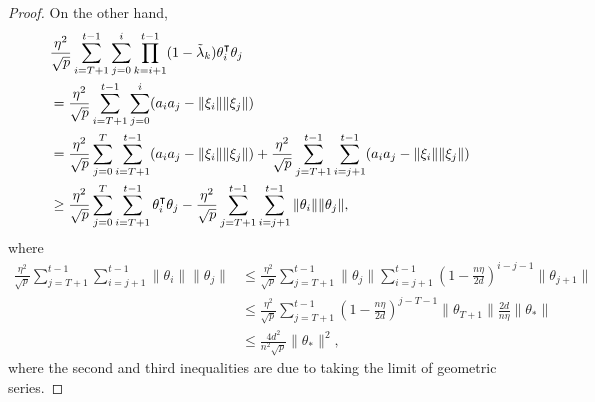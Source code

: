 \begin{proof}
    On the other hand, 
    \begin{align*}
        & \frac{\eta^2}{\sqrt p}\sum_{i=T+1}^{t-1}\sum_{j=0}^i\prod_{k=i+1}^{t-1}(1-\tlam_k) \theta_i\transpose\theta_j \\
        & = \frac{\eta^2}{\sqrt p}\sum_{i=T+1}^{t-1}\sum_{j=0}^i (a_i a_j - \|\xi_i\|\|\xi_j\|) \\
        & = \frac{\eta^2}{\sqrt p}\sum_{j=0}^T \sum_{i=T+1}^{t-1} (a_i a_j - \|\xi_i\|\|\xi_j\|) + \frac{\eta^2}{\sqrt p} \sum_{j=T+1}^{t-1} \sum_{i=j+1}^{t-1} (a_i a_j - \|\xi_i\|\|\xi_j\|) \\
        & \geq \frac{\eta^2}{\sqrt p}\sum_{j=0}^T \sum_{i=T+1}^{t-1} \theta_i\transpose\theta_j - \frac{\eta^2}{\sqrt p} \sum_{j=T+1}^{t-1} \sum_{i=j+1}^{t-1} \|\theta_i\|\|\theta_j\|,
    \end{align*}
    where
    \begin{align*}
        \frac{\eta^2}{\sqrt p} \sum_{j=T+1}^{t-1} \sum_{i=j+1}^{t-1} \|\theta_i\|\|\theta_j\| & \leq \frac{\eta^2}{\sqrt p} \sum_{j=T+1}^{t-1} \|\theta_j\| \sum_{i=j+1}^{t-1} \left( 1-\frac{n\eta}{2d} \right)^{i-j-1} \|\theta_{j+1}\| \\
        & \leq \frac{\eta^2}{\sqrt p} \sum_{j=T+1}^{t-1} \left( 1-\frac{n\eta}{2d} \right)^{j-T-1} \|\theta_{T+1}\| \frac{2d}{n\eta} \|\theta_*\| \\
        & \leq \frac{4d^2}{n^2\sqrt{p}} \|\theta_*\|^2,
    \end{align*}
    where the second and third inequalities are due to taking the limit of geometric series.
    

\end{proof}
